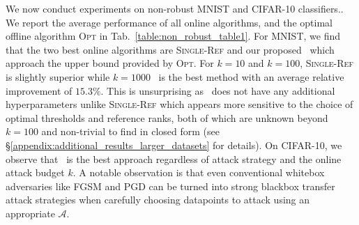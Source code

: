 We now conduct experiments on non-robust MNIST and CIFAR-10 classifiers.. We report the average performance of all online algorithms, and the optimal offline algorithm \textsc{Opt} in Tab.~\ref{table:non_robust_table1}. For MNIST, we find that the two best online algorithms are \textsc{Single-Ref} and our proposed \algoname\ which approach the upper bound provided by \textsc{Opt}. For $k=10$ and $k=100$, \textsc{Single-Ref} is slightly superior while $k=1000$ \algoname\ is the best method with an average relative improvement of $15.3\%$. This is unsurprising as \algoname\ does not have any additional hyperparameters unlike \textsc{Single-Ref} which appears more sensitive to the choice of optimal thresholds and reference ranks, both of which are unknown beyond $k=100$ and non-trivial to find in closed form (see \S\ref{appendix:additional_results_larger_datasets} for details). On CIFAR-10, we observe that \algoname\ is the best approach regardless of attack strategy and the online attack budget $k$. A notable observation is that even conventional whitebox adversaries like FGSM and PGD can be turned into strong blackbox transfer attack strategies when carefully choosing datapoints to attack using an appropriate $\mathcal{A}$.%


